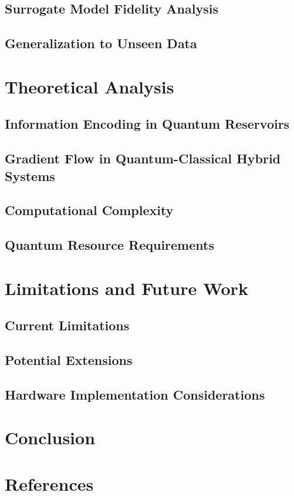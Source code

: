 \documentclass[conference]{IEEEtran}
\begin{document}
\subsection{Surrogate Model Fidelity Analysis}
\subsection{Generalization to Unseen Data}

\section{Theoretical Analysis}
\subsection{Information Encoding in Quantum Reservoirs}
\subsection{Gradient Flow in Quantum-Classical Hybrid Systems}
\subsection{Computational Complexity}
\subsection{Quantum Resource Requirements}

\section{Limitations and Future Work}
\subsection{Current Limitations}
\subsection{Potential Extensions}
\subsection{Hardware Implementation Considerations}

\section{Conclusion}


\section*{References}
\end{document}
